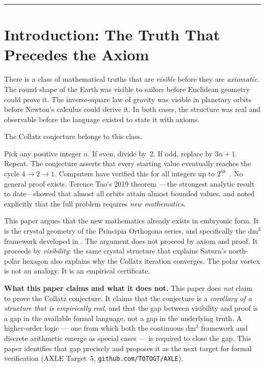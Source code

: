 \documentclass[11pt]{article}
\theoremstyle{plain}
\theoremstyle{definition}
\newenvironment{notebox}{%
  \begin{mdframed}[backgroundcolor=NoteBox,
    linecolor=PrincipiaDark!40,linewidth=0.5pt,
    innertopmargin=8pt,innerbottommargin=8pt,
    innerleftmargin=10pt,innerrightmargin=10pt]}
  {\end{mdframed}}
\begin{document}
\bigskip
{\color{PrincipiaGold}\rule{\textwidth}{0.4pt}}

\section{Introduction: The Truth That Precedes the Axiom}

There is a class of mathematical truths that are \textit{visible} before
they are \textit{axiomatic}. The round shape of the Earth was visible
to sailors before Euclidean geometry could prove it. The inverse-square
law of gravity was visible in planetary orbits before Newton's calculus
could derive it. In both cases, the structure was real and observable
before the language existed to state it with axioms.

The Collatz conjecture belongs to this class.

Pick any positive integer $n$. If even, divide by~2. If odd, replace
by $3n + 1$. Repeat. The conjecture asserts that every starting value
eventually reaches the cycle $4 \to 2 \to 1$. Computers have verified
this for all integers up to $2^{68}$~\cite{oliveira2010}. No general
proof exists. Terence Tao's 2019 theorem~\cite{tao2019}---the strongest
analytic result to date---showed that almost all orbits attain almost
bounded values, and noted explicitly that the full problem requires
\textit{new mathematics}.

This paper argues that the new mathematics already exists in embryonic
form. It is the crystal geometry of the Principia Orthogona series,
and specifically the dm$^3$ framework developed in
\cite{grossi2026gomc}. The argument does not proceed by axiom and proof.
It proceeds by \textit{visibility}: the same crystal structure that
explains Saturn's north-polar hexagon also explains why the Collatz
iteration converges. The polar vortex is not an analogy. It is an
empirical certificate.

\begin{notebox}
\textbf{What this paper claims and what it does not.}
This paper does \textit{not} claim to prove the Collatz conjecture.
It claims that the conjecture is a \textit{corollary of a structure
that is empirically real}, and that the gap between visibility and
proof is a gap in the available formal language, not a gap in the
underlying truth. A higher-order logic --- one from which both the
continuous dm$^3$ framework and discrete arithmetic emerge as special
cases --- is required to close the gap. This paper identifies that
gap precisely and proposes it as the next target for formal
verification (AXLE Target~5, \texttt{github.com/TOTOGT/AXLE}).
\end{notebox}
\end{document}
